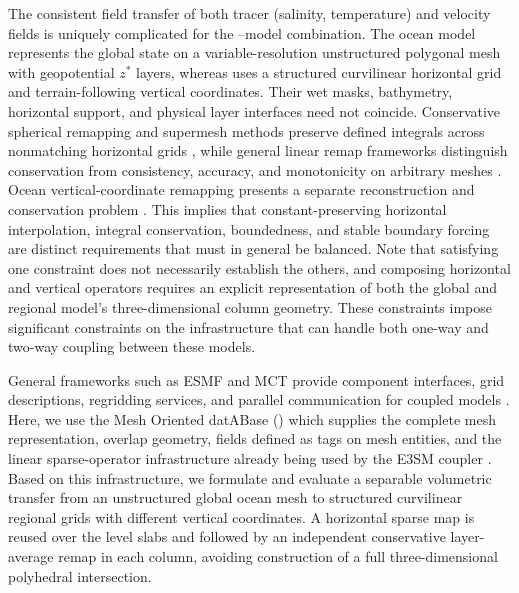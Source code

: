 The consistent field transfer of both tracer (salinity, temperature) and velocity fields is uniquely complicated for the \MPAS--\ROMS model combination. The \MPAS ocean model represents the global state on a variable-resolution unstructured polygonal mesh with geopotential $z^*$ layers, whereas \ROMS uses a structured curvilinear horizontal grid and terrain-following vertical coordinates. Their wet masks, bathymetry, horizontal support, and physical layer interfaces need not coincide. Conservative spherical remapping and supermesh methods preserve defined integrals across nonmatching horizontal grids \citep{jones1999scrip,farrell2009supermesh}, while general linear remap frameworks distinguish conservation from consistency, accuracy, and monotonicity on arbitrary meshes \citep{ullrich2015arbitrary,lauritzen2008monotone}. Ocean vertical-coordinate remapping presents a separate reconstruction and conservation problem \citep{white2009highorder}. This implies that constant-preserving horizontal interpolation, integral conservation, boundedness, and stable boundary forcing are distinct requirements that must in general be balanced. Note that satisfying one constraint does not necessarily establish the others, and composing horizontal and vertical operators requires an explicit representation of both the global and regional model's three-dimensional column geometry. These constraints impose significant constraints on the infrastructure that can handle both one-way and two-way coupling between these models.

General frameworks such as ESMF and MCT provide component interfaces, grid descriptions, regridding services, and parallel communication for coupled models \citep{hill2004esmf,larson2005mct}. Here, we use the Mesh Oriented datABase (\MOAB) \citep{moab521_2020} which supplies the complete mesh representation, overlap geometry, fields defined as tags on mesh entities, and the linear sparse-operator infrastructure already being used by the E3SM coupler \citep{mahadevan2020coupling}. Based on this infrastructure, we formulate and evaluate a separable volumetric transfer from an unstructured global ocean mesh to structured curvilinear regional grids with different vertical coordinates. A horizontal sparse map is reused over the \MPAS level slabs and followed by an independent conservative layer-average remap in each \ROMS column, avoiding construction of a full three-dimensional polyhedral intersection. %


